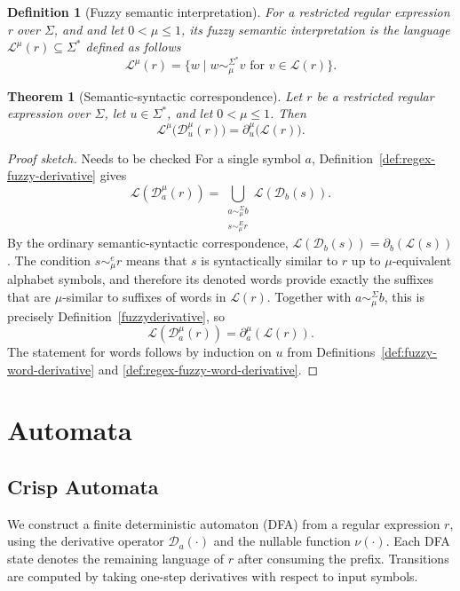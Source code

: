 \documentclass{article}
\def\cut{\mu}
\newtheorem{definition}{Definition}[section]
\newtheorem{theorem}{Theorem}[section]
\begin{document}
\begin{definition}[Fuzzy semantic interpretation] For a restricted regular expression r over $\Sigma$, and and let
$0 < \cut \le 1$,  its {\em fuzzy semantic interpretation} is the language $\mathcal L^\mu(r)\subseteq \Sigma^{\ast}$ defined as follows 
\[\mathcal L^\mu (r)=\{w\mid  w\sim_\mu^{\Sigma^\ast}v\mbox{ for } v\in \mathcal L(r)\}.\]
\end{definition}

\begin{theorem}[Semantic-syntactic correspondence]\label{the:two-fuzzy-derivative-mapping}
Let $r$ be a restricted regular expression over $\Sigma$, let $u\in\Sigma^*$, and let
$0 < \cut \le 1$. Then
\[
  \mathcal{L}^\mu\bigl(\mathcal{D}^\cut_u(r)\bigr)
  =
  \partial^\cut_u\bigl(\mathcal{L}(r)\bigr).
\] 
\end{theorem}

\begin{proof}[Proof sketch]{\color{red} Needs to be checked}
For a single symbol $a$, Definition~\ref{def:regex-fuzzy-derivative} gives
\[
  \mathcal L(\mathcal D_a^\cut(r))
  =
  \bigcup_{\substack{a\sim_\cut^\Sigma b\\ s\sim_\cut^E r}}
  \mathcal L(\mathcal D_b(s)).
\]
By the ordinary semantic-syntactic correspondence,
$\mathcal L(\mathcal D_b(s))=\partial_b(\mathcal L(s))$. The condition
$s\sim_\cut^e r$ means that $s$ is syntactically similar to $r$ up to
$\cut$-equivalent alphabet symbols, and therefore its denoted words provide
exactly the suffixes that are $\cut$-similar to suffixes of words in
$\mathcal L(r)$. Together with $a\sim_\cut^\Sigma b$, this is precisely
Definition~\ref{fuzzyderivative}, so
\[
  \mathcal L(\mathcal D_a^\cut(r))
  =
  \partial_a^\cut(\mathcal L(r)).
\]
The statement for words follows by induction on $u$ from
Definitions~\ref{def:fuzzy-word-derivative} and
\ref{def:regex-fuzzy-word-derivative}.
\end{proof}







\section{Automata}
\subsection{Crisp Automata}
We construct a finite deterministic automaton (DFA) from a regular expression $r$, using the derivative operator $\mathcal{D}_a(\cdot)$
and the nullable function $\nu(\cdot)$. Each DFA state denotes the remaining
language of $r$ after consuming the prefix. Transitions are computed by taking one-step
derivatives with respect to input symbols.
\end{document}

